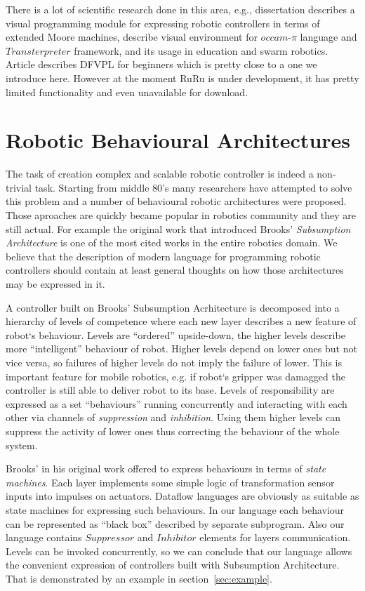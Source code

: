 \documentclass[conference,compsoc]{IEEEtran}
\begin{document}
There is a lot of scientific research done in this area, e.g., dissertation\cite{banyasad2000visual} describes a visual programming module for expressing robotic controllers in terms of extended Moore machines, \cite{simpson2008visual, posso2011process} describe visual environment for $occam\mbox{-}\pi$ language and $Transterpreter$ framework, and its usage in education and swarm robotics. Article\cite{diprose2011ruru} describes DFVPL for beginners which is pretty close to a one we introduce here. However at the moment RuRu is under development, it has pretty limited functionality and even unavailable for download.

\section{Robotic Behavioural Architectures}
\label{sec:Architectures}

The task of creation complex and scalable robotic controller is indeed a non-trivial task. Starting from middle 80's many researchers have attempted to solve this problem and a number of behavioural robotic architectures were proposed\cite{simpson2009toward}. Those aproaches are quickly became popular in robotics community and they are still actual. For example the original work that introduced Brooks' \textit{Subsumption Architecture}\cite{brooks1986robust} is one of the most cited works in the entire robotics domain. We believe that the description of modern language for programming robotic controllers should contain at least general thoughts on how those architectures may be expressed in it.

A controller built on Brooks' Subsumption Acrhitecture is decomposed into a hierarchy of levels of competence where each new layer describes a new feature of robot`s behaviour. Levels are ``ordered'' upside-down, the higher levels describe more ``intelligent''  behaviour of robot. Higher levels depend on lower ones but not vice versa, so failures of higher levels do not imply the failure of lower. This is important feature for mobile robotics, e.g. if robot`s gripper was damagged the controller is still able to deliver robot to its base. Levels of responsibility are expressed as a set ``behaviours'' running concurrently and interacting with each other via channels of \textit{suppression} and \textit{inhibition}. Using them higher levels can suppress the activity of lower ones thus correcting the behaviour of the whole system.

Brooks' in his original work offered to express behaviours in terms of \textit{state machines}. Each layer implements some simple logic of transformation sensor inputs into impulses on actuators. Dataflow languages are obviously as suitable as state machines for expressing such behaviours. In our language each behaviour can be represented as ``black box'' described by separate subprogram. Also our language contains $Suppressor$ and $Inhibitor$ elements for layers communication. Levels can be invoked concurrently, so we can conclude that our language allows the convenient expression of controllers built with Subsumption Architecture. That is demonstrated by an example in section~\ref{sec:example}.
\end{document}
